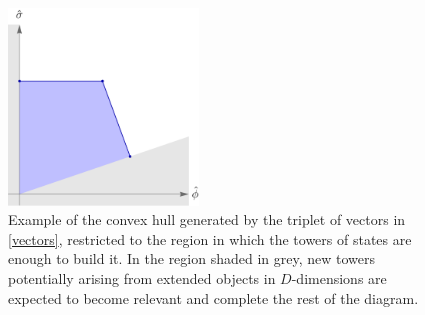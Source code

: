 \begin{figure}[htb]
\begin{center}
\includegraphics[width=0.45\textwidth]{CH-example.png}
\caption{\small Example of the convex hull generated by the triplet of vectors in \eqref{vectors}, restricted to the region in which the towers of states are enough to build it. In the region shaded in grey, new towers potentially arising from extended objects in $D$-dimensions are expected to become relevant and complete the rest of the diagram.} 
\label{fig:ch-example}
\end{center}
\end{figure}

